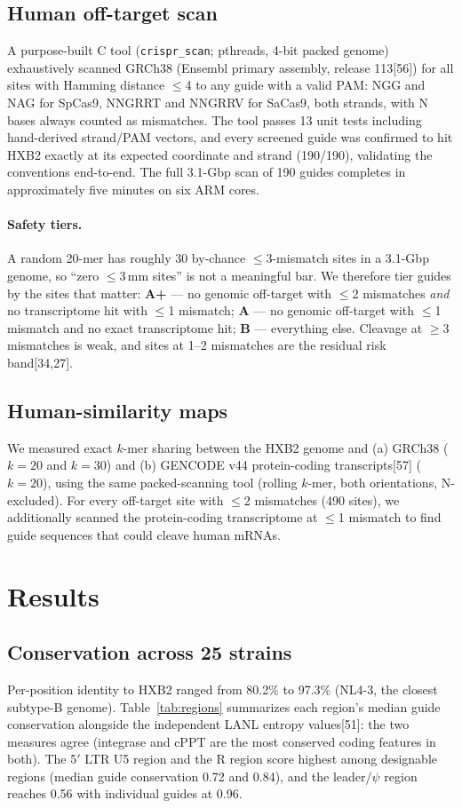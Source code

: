 \documentclass[11pt]{article}
\newcommand{\src}[1]{[#1]}
\begin{document}
\subsection{Human off-target scan}
A purpose-built C tool (\texttt{crispr\_scan}; pthreads, 4-bit packed
genome) exhaustively scanned GRCh38 (Ensembl primary assembly, release
113\src{56}) for all sites with Hamming distance $\le$4 to any guide with a
valid PAM: NGG and NAG for SpCas9, NNGRRT and NNGRRV for SaCas9, both
strands, with N bases always counted as mismatches. The tool passes 13 unit
tests including hand-derived strand/PAM vectors, and every screened guide
was confirmed to hit HXB2 exactly at its expected coordinate and strand
(190/190), validating the conventions end-to-end. The full 3.1-Gbp scan of
190 guides completes in approximately five minutes on six ARM cores.

\paragraph{Safety tiers.} A random 20-mer has roughly 30 by-chance
$\le$3-mismatch sites in a 3.1-Gbp genome, so ``zero $\le$3\,mm sites'' is
not a meaningful bar. We therefore tier guides by the sites that matter:
\textbf{A+} --- no genomic off-target with $\le$2 mismatches \emph{and} no
transcriptome hit with $\le$1 mismatch; \textbf{A} --- no genomic off-target
with $\le$1 mismatch and no exact transcriptome hit; \textbf{B} ---
everything else. Cleavage at $\ge$3 mismatches is weak, and sites at 1--2
mismatches are the residual risk band\src{34,27}.

\subsection{Human-similarity maps}
We measured exact $k$-mer sharing between the HXB2 genome and (a) GRCh38
($k=20$ and $k=30$) and (b) GENCODE v44 protein-coding transcripts\src{57}
($k=20$), using the same packed-scanning tool (rolling $k$-mer, both
orientations, N-excluded). For every off-target site with $\le$2 mismatches
(490 sites), we additionally scanned the protein-coding transcriptome at
$\le$1 mismatch to find guide sequences that could cleave human mRNAs.

\section{Results}

\subsection{Conservation across 25 strains}
Per-position identity to HXB2 ranged from 80.2\% to 97.3\% (NL4-3, the
closest subtype-B genome). Table~\ref{tab:regions} summarizes each region's
median guide conservation alongside the independent LANL entropy
values\src{51}: the two measures agree (integrase and cPPT are the most
conserved coding features in both). The 5$'$ LTR U5 region and the R region
score highest among designable regions (median guide conservation 0.72 and
0.84), and the leader/$\psi$ region reaches 0.56 with individual guides at
0.96.
\end{document}
